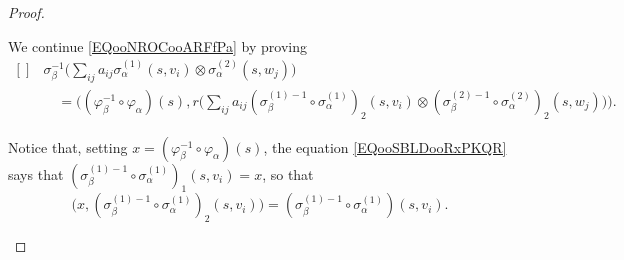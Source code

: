\begin{proof}
\begin{subproof}
\begin{subproof}
\begin{subproof}
				We continue \eqref{EQooNROCooARFfPa} by proving
				\begin{equation}		\label{EQooGVGEooRbGZUd}
					\begin{aligned}[]
						 & \sigma_{\beta}^{-1}\Big( \sum_{ij}a_{ij}\sigma_{\alpha}^{(1)}(s,v_i)\otimes \sigma_{\alpha}^{(2)}(s,w_j) \Big)                                  \\
						 & \quad = \Big( (\varphi_{\beta}^{-1}\circ\varphi_{\alpha})(s),r\big( \sum_{ij}a_{ij}(\sigma_{\beta}^{(1)-1}\circ \sigma_{\alpha}^{(1)})_2(s,v_i)
						\otimes
						(\sigma_{\beta}^{(2)-1}\circ\sigma_{\alpha}^{(2)})_2(s,w_j)
						\big) \Big).
					\end{aligned}
				\end{equation}

				Notice that, setting \( x=(\varphi_{\beta}^{-1}\circ\varphi_{\alpha})(s)\), the equation \eqref{EQooSBLDooRxPKQR} says that \(   (\sigma_{\beta}^{(1)-1}\circ\sigma_{\alpha}^{(1)})_1(s,v_i)  =x   \), so that
				\begin{equation}		\label{EQooZEBYooXtCaUP}
					\big( x,  (\sigma_{\beta}^{(1)-1}\circ\sigma_{\alpha}^{(1)})_2(s,v_i) \big) = (\sigma_{\beta}^{(1)-1}\circ\sigma_{\alpha}^{(1)})(s,v_i).
				\end{equation}


\end{subproof}
\end{subproof}
\end{subproof}
\end{proof}
